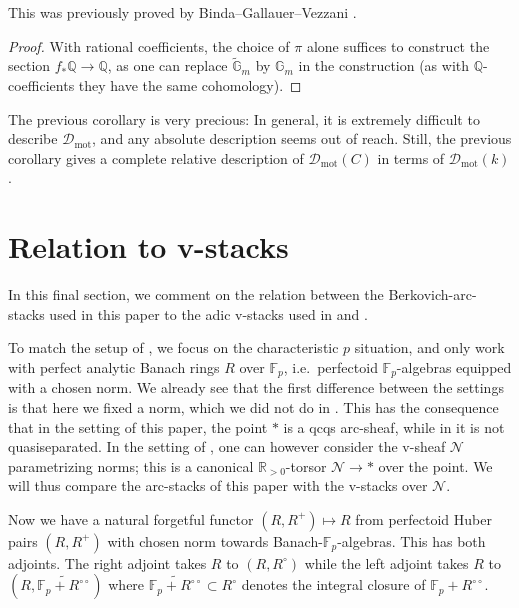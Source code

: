 \documentclass[11pt]{amsart}
\numberwithin{equation}{section}
\numberwithin{theorem}{section}
\theoremstyle{definition}
\begin{document}
This was previously proved by Binda--Gallauer--Vezzani \cite{BindaGallauerVezzani}.

\begin{proof} With rational coefficients, the choice of $\pi$ alone suffices to construct the section $f_\ast \mathbb Q\to \mathbb Q$, as one can replace $\tilde{\mathbb G}_m$ by $\mathbb G_m$ in the construction (as with $\mathbb Q$-coefficients they have the same cohomology).
\end{proof}

The previous corollary is very precious: In general, it is extremely difficult to describe $\mathcal D_{\mathrm{mot}}$, and any absolute description seems out of reach. Still, the previous corollary gives a complete relative description of $\mathcal D_{\mathrm{mot}}(C)$ in terms of $\mathcal D_{\mathrm{mot}}(k)$.

\section{Relation to v-stacks}

In this final section, we comment on the relation between the Berkovich-arc-stacks used in this paper to the adic v-stacks used in \cite{ECoD} and \cite{FarguesScholze}.

To match the setup of \cite{ECoD}, we focus on the characteristic $p$ situation, and only work with perfect analytic Banach rings $R$ over $\mathbb F_p$, i.e.~perfectoid $\mathbb F_p$-algebras equipped with a chosen norm. We already see that the first difference between the settings is that here we fixed a norm, which we did not do in \cite{ECoD}. This has the consequence that in the setting of this paper, the point $\ast$ is a qcqs arc-sheaf, while in \cite{ECoD} it is not quasiseparated. In the setting of \cite{ECoD}, one can however consider the v-sheaf $\mathcal N$ parametrizing norms; this is a canonical $\mathbb R_{>0}$-torsor $\mathcal N\to \ast$ over the point. We will thus compare the arc-stacks of this paper with the v-stacks over $\mathcal N$.

Now we have a natural forgetful functor $(R,R^+)\mapsto R$ from perfectoid Huber pairs $(R,R^+)$ with chosen norm towards Banach-$\mathbb F_p$-algebras. This has both adjoints. The right adjoint takes $R$ to $(R,R^\circ)$ while the left adjoint takes $R$ to $(R,\widetilde{\mathbb F_p+R^{\circ\circ}})$ where $\widetilde{\mathbb F_p+R^{\circ\circ}}\subset R^\circ$ denotes the integral closure of $\mathbb F_p+R^{\circ\circ}$.
\end{document}
